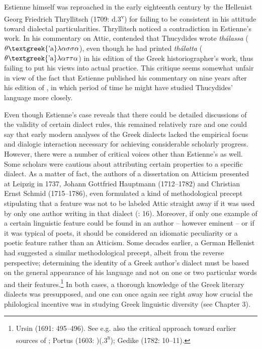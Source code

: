 \documentclass[output=paper]{langsci/langscibook}
\begin{document}
Estienne himself was reproached in the early eighteenth century by the Hellenist Georg Friedrich Thryllitsch (1709: d.3\textsuperscript{v}) for failing to be consistent in his attitude toward dialectal particularities. Thryllitsch noticed a contradiction in Estienne’s work. In his commentary on Attic, \citet[13]{Estienne1573} contended that Thucydides wrote \textit{thálassa} ($\theta \text{\textgreek{'a}}\lambda \alpha \sigma \sigma \alpha $), even though he had printed \textit{thálatta} ($\theta \text{\textgreek{'a}}\lambda \alpha \tau \tau \alpha $) in his edition of the Greek historiographer’s work, thus failing to put his views into actual practice. This critique seems somewhat unfair in view of the fact that Estienne published his commentary on \citet{Attic1573} nine years after his edition of \citet{Thucydides1564}, in which period of time he might have studied Thucydides’ language more closely.

Even though Estienne’s case reveals that there could be detailed discussions of the validity of certain dialect rules, this remained relatively rare and one could say that early modern analyses of the Greek dialects lacked the empirical focus and dialogic interaction necessary for achieving considerable scholarly progress. However, there were a number of critical voices other than Estienne’s as well. Some scholars were cautious about attributing certain properties to a specific dialect. As a matter of fact, the authors of a dissertation on Atticism presented at Leipzig in 1737, Johann Gottfried Hauptmann (1712–1782) and Christian Ernst Schmid (1715–1786), even formulated a kind of methodological precept stipulating that a feature was not to be labeled Attic straight away if it was used by only one author writing in that dialect (\citealt{HauptmannSchmid1737}: 16). Moreover, if only one example of a certain linguistic feature could be found in an author – however eminent – or if it was typical of poets, it should be considered an idiomatic peculiarity or a poetic feature rather than an Atticism. Some decades earlier, a German Hellenist had suggested a similar methodological precept, albeit from the reverse perspective; determining the identity of a Greek author’s dialect must be based on the general appearance of his language and not on one or two particular words and their features.\footnote{Ursin (1691: 495–496). See e.g. also the critical approach toward earlier sources of \citet{Walper1589}; Portus (1603: )(.3\textsc{\textsuperscript{r}}); Gedike (1782: 10–11).} In both cases, a thorough knowledge of the Greek literary dialects was presupposed, and one can once again see right away how crucial the philological incentive was in studying Greek linguistic diversity (see Chapter 3).
\end{document}
